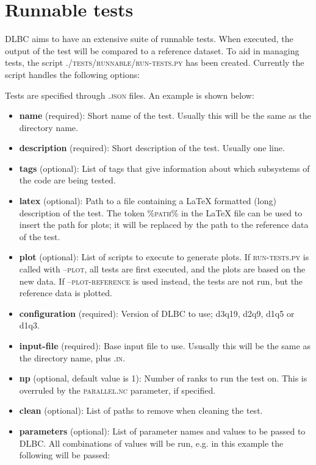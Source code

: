 \documentclass{article}
\begin{document}
\section{Runnable tests}

DLBC aims to have an extensive suite of runnable tests. When executed, the output of the test will be compared to a reference dataset.
To aid in managing tests, the script \textsc{./tests/runnable/run-tests.py} has been created.
Currently the script handles the following options:



\noindent
Tests are specified through \textsc{.json} files. An example is shown below:



\begin{itemize}
\item \textbf{name} (required): Short name of the test. Usually this will be the same as the directory name.
\item \textbf{description} (required): Short description of the test. Usually one line.
\item \textbf{tags} (optional): List of tags that give information about which subsystems of the code are being tested.
\item \textbf{latex} (optional): Path to a file containing a LaTeX formatted (long) description of the test. The token \textsc{\%path\%} in the LaTeX file can be used to insert the path for plots; it will be replaced by the path to the reference data of the test.
\item \textbf{plot} (optional): List of scripts to execute to generate plots. If \textsc{run-tests.py} is called with \textsc{--plot}, all tests are first executed, and the plots are based on the new data. If \textsc{--plot-reference} is used instead, the tests are not run, but the reference data is plotted.
\item \textbf{configuration} (required): Version of DLBC to use; d3q19, d2q9, d1q5 or d1q3.
\item \textbf{input-file} (required): Base input file to use. Ususally this will be the same as the directory name, plus \textsc{.in}.
\item \textbf{np} (optional, default value is 1): Number of ranks to run the test on. This is overruled by the \textsc{parallel.nc} parameter, if specified.
\item \textbf{clean} (optional): List of paths to remove when cleaning the test.
\item \textbf{parameters} (optional): List of parameter names and values to be passed to DLBC. All combinations of values will be run, e.g. in this example the following will be passed:

\end{itemize}
\end{document}
